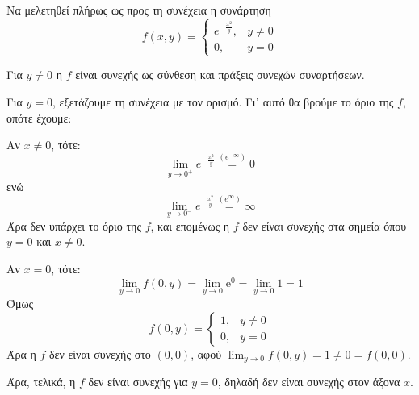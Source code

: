 \documentclass[a4paper,11pt]{report}
\begin{document}
\begin{example}
  Να μελετηθεί πλήρως ως προς τη συνέχεια η συνάρτηση 
  \[
    f(x,y) = 
    \begin{cases} 
      e^{-\frac{x^{2}}{y}}, & y \neq 0 \\ 0, & y= 0 
    \end{cases}  
  \] 
  \begin{solution}
  \item {}
    Για $ y \neq 0 $ η $f$ είναι συνεχής ως σύνθεση και πράξεις συνεχών 
    συναρτήσεων. 

    Για $ y =0 $, εξετάζουμε τη συνέχεια με τον ορισμό. Γι᾽ αυτό θα βρούμε το 
    όριο της $f$, οπότε έχουμε:
    \begin{myitemize}
      \item Αν $ x \neq 0 $, τότε:
        \[
          \lim_{y \to 0^{+}} e^{- \frac{x^{2}}{y}} \overset{(e^{- \infty})}{=} 0 
        \] 
        ενώ 
        \[
          \lim_{y \to 0^{-}} e^{- \frac{x^{2}}{y}} \overset{(e^{\infty})}{=} \infty
        \]
        Άρα δεν υπάρχει το όριο της $f$, και επομένως η $f$ δεν είναι συνεχής στα σημεία
        όπου $ y=0 $ και $ x \neq 0 $.
      \item Αν $ x = 0 $, τότε: 
        \[
          \lim_{y \to 0} f(0,y) = \lim_{y \to 0} \mathrm{e}^{0} = \lim_{y \to 0} 1 = 1
        \] 
        Όμως
        \[
          f(0,y) = 
          \begin{cases} 
            1, & y \neq 0 \\ 0, & y= 0 
          \end{cases} 
        \] 
        Άρα η $f$ δεν είναι συνεχής στο $ (0,0) $, αφού $ \lim_{y \to 0} f(0,y) = 1 \neq
        0 = f(0,0) $.

        Άρα, τελικά, η $f$ δεν είναι συνεχής για $ y=0 $, δηλαδή δεν είναι συνεχής 
        στον άξονα $x$.
    \end{myitemize}
  \end{solution}
\end{example}
\end{document}
